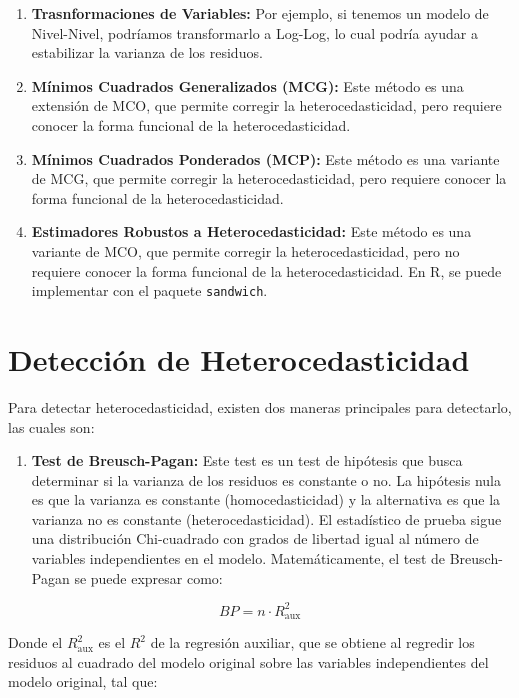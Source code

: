 \documentclass[
]{book}
\providecommand{\tightlist}{%
  \setlength{\itemsep}{0pt}\setlength{\parskip}{0pt}}
\begin{document}
\begin{enumerate}
\def\labelenumi{\arabic{enumi})}
\tightlist
\item
  \textbf{Trasnformaciones de Variables:} Por ejemplo, si tenemos un modelo de Nivel-Nivel, podríamos transformarlo a Log-Log, lo cual podría ayudar a estabilizar la varianza de los residuos.
\item
  \textbf{Mínimos Cuadrados Generalizados (MCG):} Este método es una extensión de MCO, que permite corregir la heterocedasticidad, pero requiere conocer la forma funcional de la heterocedasticidad.
\item
  \textbf{Mínimos Cuadrados Ponderados (MCP):} Este método es una variante de MCG, que permite corregir la heterocedasticidad, pero requiere conocer la forma funcional de la heterocedasticidad.
\item
  \textbf{Estimadores Robustos a Heterocedasticidad:} Este método es una variante de MCO, que permite corregir la heterocedasticidad, pero no requiere conocer la forma funcional de la heterocedasticidad. En R, se puede implementar con el paquete \texttt{sandwich}.
\end{enumerate}

\section{Detección de Heterocedasticidad}\label{detecciuxf3n-de-heterocedasticidad}

Para detectar heterocedasticidad, existen dos maneras principales para detectarlo, las cuales son:

\begin{enumerate}
\def\labelenumi{\arabic{enumi})}
\tightlist
\item
  \textbf{Test de Breusch-Pagan:} Este test es un test de hipótesis que busca determinar si la varianza de los residuos es constante o no. La hipótesis nula es que la varianza es constante (homocedasticidad) y la alternativa es que la varianza no es constante (heterocedasticidad). El estadístico de prueba sigue una distribución Chi-cuadrado con grados de libertad igual al número de variables independientes en el modelo.
  Matemáticamente, el test de Breusch-Pagan se puede expresar como:
\end{enumerate}

\[
BP = n \cdot R^2_{\text{aux}}
\]

Donde el \(R^2_{\text{aux}}\) es el \(R^2\) de la regresión auxiliar, que se obtiene al regredir los residuos al cuadrado del modelo original sobre las variables independientes del modelo original, tal que:
\end{document}
